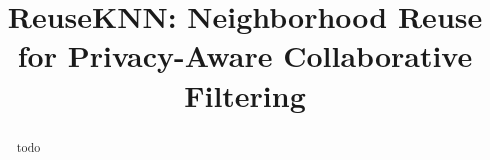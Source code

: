 \documentclass[manuscript,review,anonymous]{acmart}
\newcommand{\dk}[1]{
        \textcolor{blue}{DK: #1}}
\begin{document}
\title{ReuseKNN: Neighborhood Reuse for Privacy-Aware Collaborative Filtering}





\begin{abstract}
todo
\end{abstract}




\maketitle
\end{document}
